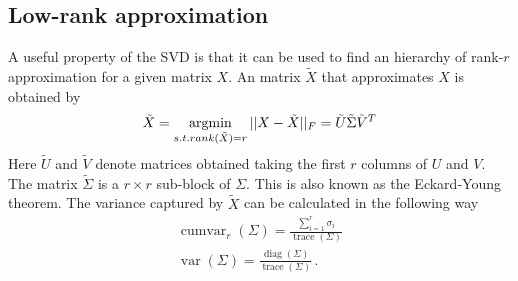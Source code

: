 \subsection{Low-rank approximation}
A useful property of the SVD is that it can be used to find an hierarchy of rank-\(r\) approximation for a given matrix \(X\).
An matrix \(\tilde{X}\) that approximates \(X\) is obtained by 
\begin{gather}
\tilde{X} = \operatorname*{argmin}\limits_{s.t. rank(\tilde{X}) = r} 
 ||X - \tilde{X}||_F = \tilde{U}\tilde{\Sigma}\tilde{V}^{T}
\end{gather}	
Here  \(\tilde{U}\) and \(\tilde{V}\) denote matrices obtained taking the first \(r\) columns of \(U\) and \(V\). The matrix \(\tilde{\Sigma}\) is a \(r \times r\) sub-block of \(\Sigma\).
This is also known as the Eckard-Young theorem.
The variance captured by \(\tilde{X}\) can be calculated in the following way \cite{brunton_kutz_2019b}
\begin{gather}
\operatorname{cumvar}_{r}(\Sigma) = \frac{\sum_{i = 1}^{r} \sigma_i}{\operatorname{trace}(\Sigma)} \label{cum-var-r} \\
\operatorname{var}(\Sigma) = \frac{\operatorname{diag}(\Sigma)}{\operatorname{trace}(\Sigma)} \,. \label{var-sig}
\end{gather}

